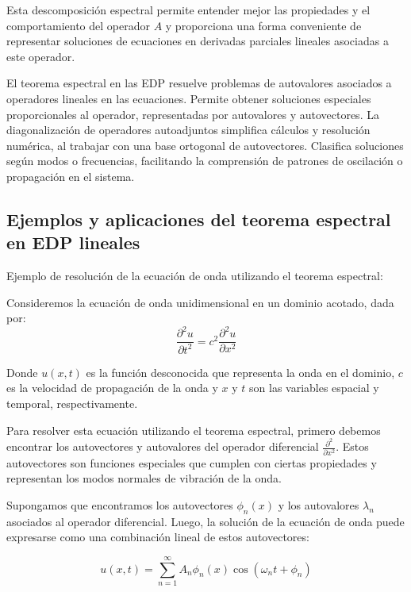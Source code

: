 \documentclass{article}
\begin{document}
    Esta descomposición espectral permite entender mejor las propiedades y el comportamiento del operador $A$ y  proporciona una forma conveniente de representar soluciones de ecuaciones en derivadas parciales lineales asociadas a este operador.
 
   El teorema espectral en las EDP resuelve problemas de autovalores asociados a operadores lineales en las ecuaciones. Permite obtener soluciones especiales proporcionales al operador, representadas por autovalores y autovectores. La diagonalización de operadores autoadjuntos simplifica cálculos y resolución numérica, al trabajar con una base ortogonal de autovectores. Clasifica soluciones según modos o frecuencias, facilitando la comprensión de patrones de oscilación o propagación en el sistema.

    \subsection{Ejemplos y aplicaciones del teorema espectral en EDP lineales}
    Ejemplo de resolución de la ecuación de onda utilizando el teorema espectral:

    Consideremos la ecuación de onda unidimensional en un dominio acotado, dada por:
    \begin{equation}
    \frac{{\partial^2 u}}{{\partial t^2}} = c^2 \frac{{\partial^2 u}}{{\partial x^2}}
    \end{equation}

    Donde \(u(x, t)\) es la función desconocida que representa la onda en el dominio, \(c\) es la velocidad de propagación de la onda y \(x\) y \(t\) son las variables espacial y temporal, respectivamente.
    
    Para resolver esta ecuación utilizando el teorema espectral, primero debemos encontrar los autovectores y autovalores del operador diferencial \(\frac{{\partial^2}}{{\partial x^2}}\). Estos autovectores son funciones especiales que cumplen con ciertas propiedades y representan los modos normales de vibración de la onda.
    
    Supongamos que encontramos los autovectores \(\phi_n(x)\) y los autovalores \(\lambda_n\) asociados al operador diferencial. Luego, la solución de la ecuación de onda puede expresarse como una combinación lineal de estos autovectores:
    
    \begin{equation}
    u(x, t) = \sum_{n=1}^{\infty} A_n \phi_n(x) \cos(\omega_n t + \phi_n)
    \end{equation}
    
\end{document}
